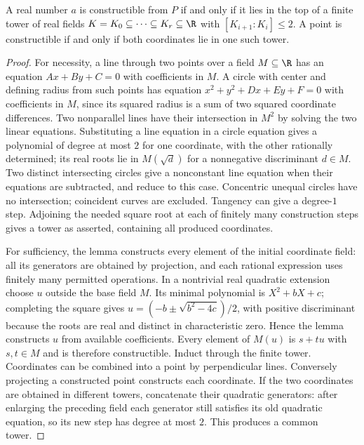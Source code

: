 \begin{theorem}
A real number $a$ is constructible from $P$ if and only if it lies in the top of a finite tower of real fields $K=K_0\subseteq\cdots\subseteq K_r\subseteq\R$ with $[K_{i+1}:K_i]\leq2$. A point is constructible if and only if both coordinates lie in one such tower.
\end{theorem}
\begin{proof}
For necessity, a line through two points over a field $M\subseteq\R$ has an equation $Ax+By+C=0$ with coefficients in $M$. A circle with center and defining radius from such points has equation $x^2+y^2+Dx+Ey+F=0$ with coefficients in $M$, since its squared radius is a sum of two squared coordinate differences. Two nonparallel lines have their intersection in $M^2$ by solving the two linear equations. Substituting a line equation in a circle equation gives a polynomial of degree at most $2$ for one coordinate, with the other rationally determined; its real roots lie in $M(\sqrt d)$ for a nonnegative discriminant $d\in M$. Two distinct intersecting circles give a nonconstant line equation when their equations are subtracted, and reduce to this case. Concentric unequal circles have no intersection; coincident curves are excluded. Tangency can give a degree-$1$ step. Adjoining the needed square root at each of finitely many construction steps gives a tower as asserted, containing all produced coordinates.

For sufficiency, the lemma constructs every element of the initial coordinate field: all its generators are obtained by projection, and each rational expression uses finitely many permitted operations. In a nontrivial real quadratic extension choose $u$ outside the base field $M$. Its minimal polynomial is $X^2+bX+c$; completing the square gives $u=(-b\pm\sqrt{b^2-4c})/2$, with positive discriminant because the roots are real and distinct in characteristic zero. Hence the lemma constructs $u$ from available coefficients. Every element of $M(u)$ is $s+tu$ with $s,t\in M$ and is therefore constructible. Induct through the finite tower. Coordinates can be combined into a point by perpendicular lines. Conversely projecting a constructed point constructs each coordinate. If the two coordinates are obtained in different towers, concatenate their quadratic generators: after enlarging the preceding field each generator still satisfies its old quadratic equation, so its new step has degree at most $2$. This produces a common tower.
\end{proof}

